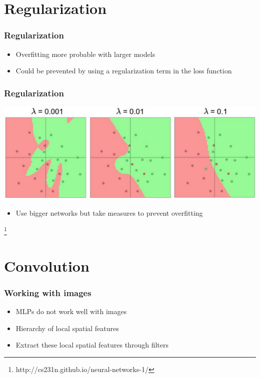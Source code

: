 \documentclass{beamer}
\newcommand\blfootnote[1]{%
  \begingroup
  \renewcommand\thefootnote{}\footnote{#1}%
  \addtocounter{footnote}{-1}%
  \endgroup
}
\begin{document}
\section{Regularization}

\begin{frame}
  \frametitle{Regularization}
  \begin{itemize}
  \item Overfitting more probable with larger models
  \item Could be prevented by using a regularization term in the loss function
  \end{itemize}
\end{frame}

\begin{frame}
  \frametitle{Regularization}
  \includegraphics[width=\textwidth]{reg_strengths.jpeg}
  \begin{itemize}
  \item Use bigger networks but take measures to prevent overfitting
  \end{itemize}
  \blfootnote{http://cs231n.github.io/neural-networks-1/}
\end{frame}

\section{Convolution}

\begin{frame}
  \frametitle{Working with images}
  \begin{itemize}
  \item MLPs do not work well with images
  \item Hierarchy of local spatial features
  \item Extract these local spatial features through filters
  \end{itemize}
\end{frame}
\end{document}
